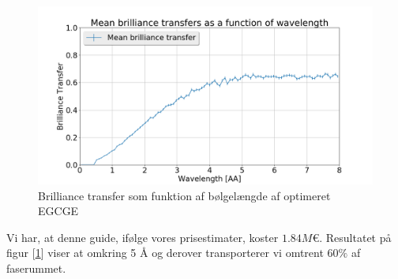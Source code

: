 \documentclass[12pt,oneside,a4paper]{article}
\begin{document}
{{{{{\begin{figure}[H]
\centering
\includegraphics[width=1\textwidth]{brill_optimized_mean_148957776280566.png}
\caption{Brilliance transfer som funktion af bølgelængde af optimeret EGCGE} \label{EGCGE_brill}
\end{figure}
Vi har, at denne guide, ifølge vores prisestimater, koster $1.84M\text{€}$. Resultatet på figur [\ref{EGCGE_brill}] viser at omkring 5 Å og derover transporterer vi omtrent $60\%$ af faserummet.

}}}}}
\end{document}
